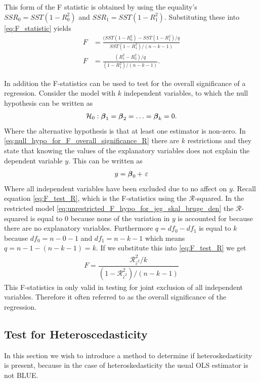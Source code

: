 This form of the F statistic is obtained by using the equality's $SSR_0 = SST(1 - R^2_0)$ and $SSR_1 = SST(1-R^2_1)$. Substituting these into \eqref{eq:F_statistic} yields
\begin{align}\label{eq:F_test_R}
    F &= \frac{(SST(1 - R^2_0) - SST(1-R^2_1)/q}{SST(1-R^2_1)/(n-k-1)} \nonumber \\
    F &= \frac{(R^2_1 - R^2_0)/q}{(1 - R^2_1)/(n-k-1)}.
\end{align}

In addition the F-statistics can be used to test for the overall significance of a regression. Consider the model with $k$ independent variables, to which the null hypothesis can be written as
\begin{align}\label{eq:null_hypo_for_F_overall_significance_R}
    \mathcal{H}_0: \operatorname{\boldsymbol{\beta}}_1 = \operatorname{\boldsymbol{\beta}}_2 = \ldots = \operatorname{\boldsymbol{\beta}}_k = 0.
\end{align}
Where the alternative hypothesis is that at least one estimator is non-zero. In \eqref{eq:null_hypo_for_F_overall_significance_R} there are $k$ restrictions and they state that knowing the values of the explanatory variables does not explain the dependent variable $y$. This can be written as
\begin{align}\label{eq:unrestricted_F_hypo_for_jeg_skal_bruge_den}
    y = \operatorname{\boldsymbol{\beta}}_0 + \ \varepsilon
\end{align}
Where all independent variables have been excluded due to no affect on $y$. 
Recall equation \eqref{eq:F_test_R}, which is the F-statistics using the $\mathcal{R}$-squared. 
In the restricted model \eqref{eq:unrestricted_F_hypo_for_jeg_skal_bruge_den} the $\mathcal{R}$-squared is equal to $0$ because none of the variation in $y$ is accounted for because there are no explanatory variables. 
Furthermore $q = df_0 - df_{1}$ is equal to $k$ because $df_0 = n-0-1$ and $df_{1} = n-k-1$ which means $q = n-1 - (n-k-1) = k$. If we substitute this into \eqref{eq:F_test_R} we get
\begin{align}\label{eq:udvidelse_til_F_stat}
    F = \dfrac{\mathcal{R}^2_{\hat{\varepsilon}^2}/k}{(1-\mathcal{R}^2_{\hat{\varepsilon}^2}) / (n-k-1)}
\end{align}
This F-statistics in only valid in testing for joint exclusion of all independent variables. 
Therefore it often referred to as the overall significance of the regression. 

\subsection{Test for Heteroscedasticity}
In this section we wish to introduce a method to determine if heteroskedasticity is present, because in the case of heteroskedasticity the usual OLS estimator is not BLUE. 

